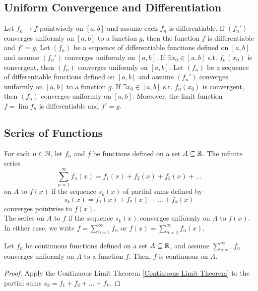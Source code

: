 \documentclass[11pt]{article}
\begin{document}
\subsection{Uniform Convergence and Differentiation}
 Let $f_n \rightarrow f$ pointwisely on $[a,b]$ and assume each $f_n$ is differentiable. If $(f_n')$ converges uniformly on $[a,b]$ to a function $g$, then the function $f$ is differentiable and $f' = g$.
\theorem Let $(f_n)$ be a sequence of differentiable functions defined on $[a,b]$ and assume $(f_n')$ converges uniformly on $[a,b]$. If $\exists x_0 \in [a,b]$ s.t. $f_n(x_0)$ is convergent, then $(f_n)$ converges uniformly on $[a,b]$.
 Let $(f_n)$ be a sequence of differentiable functions defined on $[a,b]$ and assume $(f_n')$ converges uniformly on $[a,b]$ to a function $g$. If $\exists x_0 \in [a,b]$ s.t. $f_n(x_0)$ is convergent, then $(f_n)$ converges uniformly on $[a,b]$. Moreover, the limit function $f = \lim f_n$ is differentiable and $f' = g$.


\subsection{Series of Functions}

 For each $n \in \mathbb{N}$, let $f_n$ and $f$ be functions defined on a set $A \subseteq \mathbb{R}$. The infinite series
$$\sum_{n=1}^\infty f_n(x) = f_1(x) + f_2(x) + f_3(x) + \hdots$$
 on $A$ to $f(x)$ if the sequence $s_k(x)$ of partial sums defined by
$$s_k(x) = f_1(x) + f_2(x) + \hdots + f_k(x)$$
converges pointwise to $f(x)$. \\
The series  on $A$ to $f$ if the sequence $s_k(x)$ converges uniformly on $A$ to $f(x)$.\\
In either case, we write $f = \sum_{n=1}^\infty f_n$ or $f(x) = \sum_{n=1}^\infty f_n(x)$.

 Let $f_n$ be continuous functions defined on a set $A \subseteq \mathbb{R}$, and assume $\sum_{n=1}^\infty f_n$ converges uniformly on $A$ to a function $f$. Then, $f$ is continuous on $A$.

\begin{proof}
	Apply the Continuous Limit Theorem \ref{Continuous Limit Theorem} to the partial sums $s_k = f_1 + f_2 + \hdots + f_k$.
\end{proof}
\end{document}
